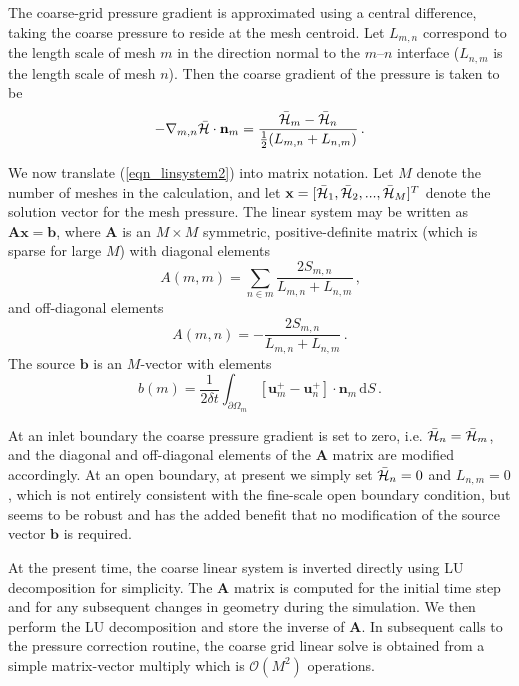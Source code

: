 \documentclass[11pt]{book}
\begin{document}
The coarse-grid pressure gradient is approximated using a central difference, taking the coarse pressure to reside at the mesh centroid.  Let $L_{m,n}$ correspond to the length scale of mesh $m$ in the direction normal to the $m$--$n$ interface ($L_{n,m}$ is the length scale of mesh $n$).  Then the coarse gradient of the pressure is taken to be
\begin{equation}
\label{eqn_coarsegrad}
-\nabla_{m,n}\bar{{\cal H}} \cdot \mathbf{n}_{m} = \frac{ \bar{{\cal H}}_m - \bar{{\cal H}}_n }{\frac{1}{2}(L_{m,n} + L_{n,m})} \,\mbox{.}
\end{equation}

We now translate (\ref{eqn_linsystem2}) into matrix notation.  Let $M$ denote the number of meshes in the calculation, and let $\mathbf{x} = [\bar{{\cal H}}_1,\bar{{\cal H}}_2,...,\bar{{\cal H}}_M]^T$ denote the solution vector for the mesh pressure.  The linear system may be written as $\mathbf{A}\mathbf{x} = \mathbf{b}$, where $\mathbf{A}$ is an $M \times M$ symmetric, positive-definite matrix (which is sparse for large $M$) with diagonal elements
\begin{equation}
\label{eqn_adiag}
A(m,m) = \sum_{n\in m} \frac{2 S_{m,n}}{L_{m,n} + L_{n,m}} \,\mbox{,}
\end{equation}
and off-diagonal elements
\begin{equation}
\label{eqn_aoffdiag}
A(m,n) = - \frac{2 S_{m,n}}{L_{m,n} + L_{n,m}} \,\mbox{.}
\end{equation}
The source $\mathbf{b}$ is an $M$-vector with elements
\begin{equation}
\label{eqn_belements}
b(m) = \frac{1}{2 \delta t} \int_{\partial \Omega_{m}} \left[ \mathbf{u}^+_m - \mathbf{u}^+_n \right] \cdot \mathbf{n}_{m} \,\mbox{d}S \,\mbox{.}
\end{equation}

At an inlet boundary the coarse pressure gradient is set to zero, i.e. $\bar{{\cal H}}_n = \bar{{\cal H}}_m$, and the diagonal and off-diagonal elements of the $\mathbf{A}$ matrix are modified accordingly.  At an open boundary, at present we simply set $\bar{{\cal H}}_n = 0$ and $L_{n,m} = 0$, which is not entirely consistent with the fine-scale open boundary condition, but seems to be robust and has the added benefit that no modification of the source vector $\mathbf{b}$ is required.

At the present time, the coarse linear system is inverted directly using LU decomposition for simplicity.  The $\mathbf{A}$ matrix is computed for the initial time step and for any subsequent changes in geometry during the simulation.  We then perform the LU decomposition and store the inverse of $\mathbf{A}$.  In subsequent calls to the pressure correction routine, the coarse grid linear solve is obtained from a simple matrix-vector multiply which is $\mathcal{O}(M^2)$ operations.
\end{document}
